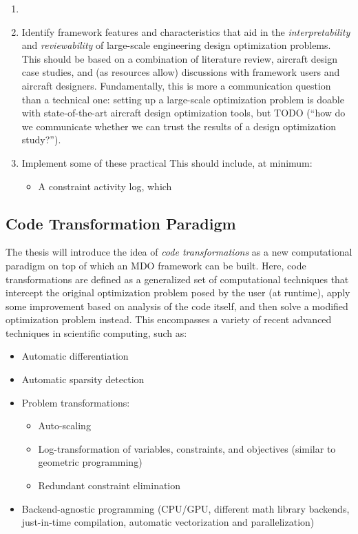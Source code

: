 \documentclass[12pt,vi,oneside]{report}
\begin{document}
\begin{enumerate}
\begin{enumerate}
        \end{enumerate}
        \item
        \item Identify framework features and characteristics that aid in the \textit{interpretability} and \textit{reviewability} of large-scale engineering design optimization problems. This should be based on a combination of literature review, aircraft design case studies, and (as resources allow) discussions with framework users and aircraft designers. Fundamentally, this is more a communication question than a technical one: setting up a large-scale optimization problem is doable with state-of-the-art aircraft design optimization tools, but TODO (``how do we communicate whether we can trust the results of a design optimization study?'').
        \item Implement some of these practical This should include, at minimum:
        \begin{itemize}
            \item A constraint activity log, which
        \end{itemize}
    \end{enumerate}

    \subsection{Code Transformation Paradigm}

    The thesis will introduce the idea of \textit{code transformations} as a new computational paradigm on top of which an MDO framework can be built. Here, code transformations are defined as a generalized set of computational techniques that intercept the original optimization problem posed by the user (at runtime), apply some improvement based on analysis of the code itself, and then solve a modified optimization problem instead. This encompasses a variety of recent advanced techniques in scientific computing, such as:
    \begin{itemize}[noitemsep]
        \item Automatic differentiation \cite{griewank_automatic_1988}
        \item Automatic sparsity detection \cite{gebremedhin_efficient_2009}
        \item Problem transformations:
        \begin{itemize}[noitemsep]
            \item Auto-scaling \cite{nocedal_numerical_2006}
            \item Log-transformation of variables, constraints, and objectives (similar to geometric programming) \cite{kirschen, agrawal_disciplined_2019}
            \item Redundant constraint elimination
        \end{itemize}
        \item Backend-agnostic programming (CPU/GPU, different math library backends, just-in-time compilation, automatic vectorization and parallelization) \cite{jax}
    \end{itemize}
\end{document}
